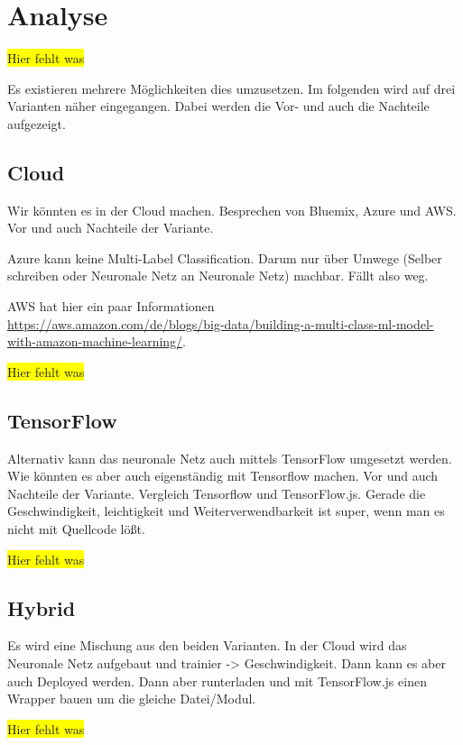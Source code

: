 \section{Analyse}
\colorbox{yellow}{Hier fehlt was}

Es existieren mehrere Möglichkeiten dies umzusetzen. Im folgenden wird auf drei Varianten näher eingegangen. Dabei werden
die Vor- und auch die Nachteile aufgezeigt.

\subsection{Cloud}
Wir könnten es in der Cloud machen. Besprechen von Bluemix, Azure und AWS. Vor und auch Nachteile der Variante.

Azure kann keine Multi-Label Classification. Darum nur über Umwege (Selber schreiben oder Neuronale Netz an Neuronale Netz)
machbar. Fällt also weg.

AWS hat hier ein paar Informationen\\
\url{https://aws.amazon.com/de/blogs/big-data/building-a-multi-class-ml-model-with-amazon-machine-learning/}.

\colorbox{yellow}{Hier fehlt was}

\subsection{TensorFlow}
Alternativ kann das neuronale Netz auch mittels TensorFlow umgesetzt werden.
Wie könnten es aber auch eigenständig mit Tensorflow machen. Vor und auch Nachteile der Variante. Vergleich Tensorflow
und TensorFlow.js. Gerade die Geschwindigkeit, leichtigkeit und Weiterverwendbarkeit ist super, wenn man es nicht mit
Quellcode lößt.

\colorbox{yellow}{Hier fehlt was}

\subsection{Hybrid}
Es wird eine Mischung aus den beiden Varianten. In der Cloud wird das Neuronale Netz aufgebaut und trainier -> Geschwindigkeit.
Dann kann es aber auch Deployed werden. Dann aber runterladen und mit TensorFlow.js einen Wrapper bauen um die gleiche
Datei/Modul.

\colorbox{yellow}{Hier fehlt was}